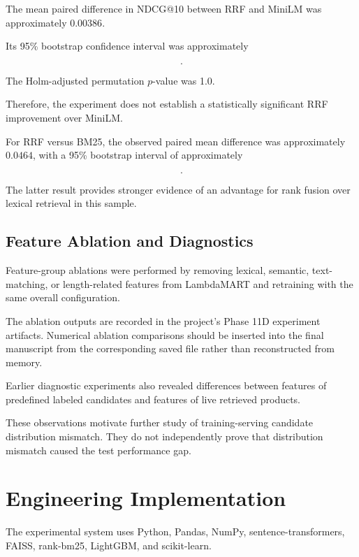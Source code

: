\documentclass[conference]{IEEEtran}
\begin{document}
The mean paired difference
in NDCG@10 between RRF and
MiniLM was approximately
$0.00386$.

Its 95\% bootstrap confidence
interval was approximately

\begin{equation}
[-0.0327,\;0.0392].
\end{equation}

The Holm-adjusted permutation
$p$-value was 1.0.

Therefore, the experiment does
not establish a statistically
significant RRF improvement
over MiniLM.

For RRF versus BM25, the
observed paired mean difference
was approximately $0.0464$,
with a 95\% bootstrap interval
of approximately

\begin{equation}
[0.0223,\;0.0724].
\end{equation}

The latter result provides
stronger evidence of an advantage
for rank fusion over lexical
retrieval in this sample.

\subsection{Feature Ablation and Diagnostics}

Feature-group ablations were
performed by removing lexical,
semantic, text-matching, or
length-related features from
LambdaMART and retraining with
the same overall configuration.

The ablation outputs are recorded
in the project's Phase 11D
experiment artifacts. Numerical
ablation comparisons should be
inserted into the final manuscript
from the corresponding saved file
rather than reconstructed from
memory.

Earlier diagnostic experiments
also revealed differences between
features of predefined labeled
candidates and features of live
retrieved products.

These observations motivate
further study of training-serving
candidate distribution mismatch.
They do not independently prove
that distribution mismatch caused
the test performance gap.

\section{Engineering Implementation}

The experimental system uses
Python, Pandas, NumPy,
sentence-transformers, FAISS,
rank-bm25, LightGBM,
and scikit-learn.
\end{document}
